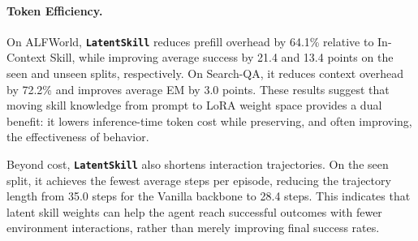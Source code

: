 \documentclass{llmxive}
\providecommand{\textttt}[1]{\texttt{#1}}
\providecommand{\method}{\textbf{\textttt{LatentSkill}}}
\begin{document}
 
 
\paragraph{Token Efficiency.}
On ALFWorld, \method{} reduces prefill overhead by 64.1\% relative to In-Context Skill, while improving average success by 21.4 and 13.4 points on the seen and unseen splits, respectively. On Search-QA, it reduces context overhead by 72.2\% and improves average EM by 3.0 points. These results suggest that moving skill knowledge from prompt to LoRA weight space provides a dual benefit: it lowers inference-time token cost while preserving, and often improving, the effectiveness of behavior.

Beyond cost, \method{} also shortens interaction trajectories. On the seen split, it achieves the fewest average steps per episode, reducing the trajectory length from 35.0 steps for the Vanilla backbone to 28.4 steps. This indicates that latent skill weights can help the agent reach successful outcomes with fewer environment interactions, rather than merely improving final success rates.
 
\end{document}
